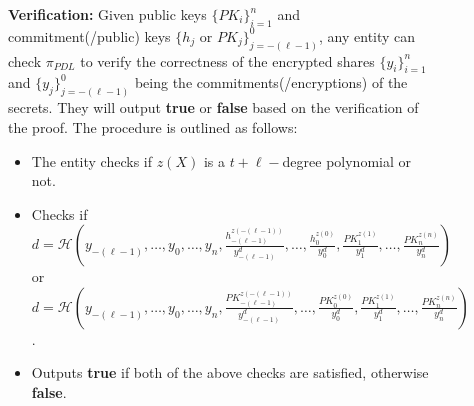 \begin{figure}[ht]
{\begin{tcolorbox}[title=\textbf{$\Lambda_{RO}^{'}$}, width=1.2\textwidth, colframe=blue!75!black, colback=blue!10, sharp corners]
        \vspace{0.5em}
        \textbf{Verification:}
            Given public keys $\{PK_i\}_{i=1}^n$ and commitment(/public) keys $\{h_j\text{ or }PK_j\}_{j=-(\ell-1)}^0$, any entity can check 
            $\pi_{PDL}$ to verify the correctness of the encrypted shares $\{y_i\}_{i=1}^n$ and $\{y_j\}_{j=-(\ell-1)}^0$ being the commitments(/encryptions) of the secrets. 
            They will output \textbf{true} or \textbf{false} based on the verification of the proof. The 
            procedure is outlined as follows:
        \begin{itemize}
            \item The entity checks if $z(X)$ is a $t+\ell-$degree polynomial or not.
            \item Checks if $d=\mathcal{H}(y_{-(\ell-1)},\dots,y_0,\dots,y_n,\frac{h_{-(\ell-1)}^{z(-(\ell-1))}}{y_{-(\ell-1)}^d},\dots,\frac{h_{0}^{z(0)}}{y_0^d},\frac{PK_1^{z(1)}}{y_1^d},\dots,\frac{PK_n^{z(n)}}{y_n^d})$ or 
            $d=\mathcal{H}(y_{-(\ell-1)},\dots,y_0,\dots,y_n,\frac{PK_{-(\ell-1)}^{z(-(\ell-1))}}{y_{-(\ell-1)}^d},\dots,\frac{PK_{0}^{z(0)}}{y_0^d},\frac{PK_1^{z(1)}}{y_1^d},\dots,\frac{PK_n^{z(n)}}{y_n^d})$ .
            \item Outputs \textbf{true} if both of the above checks are satisfied, otherwise \textbf{false}.
        \end{itemize}


\end{tcolorbox}}
\end{figure}
